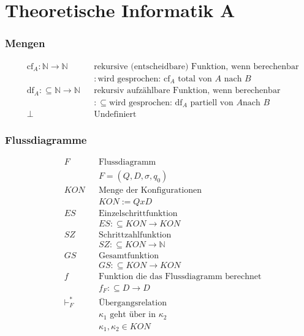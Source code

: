 \documentclass[10pt,oneside,a4paper]{scrartcl}
\begin{document}
\part{Theoretische Informatik A}

\section{Mengen}

    \begin{align}
    &\text{cf}_A :\mathbb{N} \longrightarrow \mathbb{N}
        && \text{rekursive (entscheidbare) Funktion, wenn berechenbar}\\
        &&&: \text{wird gesprochen: $\text{cf}_A$ total von $A$ nach $B$}
        \nonumber\\
    &\text{df}_A :\subseteq \mathbb{N} \longrightarrow \mathbb{N}
        && \text{rekursiv aufzählbare Funktion, wenn berechenbar}\\
        &&&:\subseteq \text{wird gesprochen: $\text{df}_A$ partiell von $A$
        nach $B$}\nonumber\\
    &\perp && \text{Undefiniert}
    \end{align}

\section{Flussdiagramme}

    \begin{align}
    &F   && \text{Flussdiagramm}\nonumber\\
            &&&F = (Q, D, \sigma, q_0)\\
    &KON && \text{Menge der Konfigurationen}\nonumber\\
            &&&KON := Q x D\\
    &ES  && \text{Einzelschrittfunktion}\nonumber\\
            &&&ES :\subseteq KON \longrightarrow KON\\
    &SZ  && \text{Schrittzahlfunktion}\nonumber\\
            &&&SZ :\subseteq KON \longrightarrow \mathbb{N}\\
    &GS  && \text{Gesamtfunktion}\nonumber\\
            &&&GS :\subseteq KON \longrightarrow KON\\
    &f   && \text{Funktion die das Flussdiagramm berechnet}\nonumber\\
            &&&f_F :\subseteq D \longrightarrow D\\
    &\vdash^{*}_{F}
         && \text{Übergangsrelation}\\
            &&&\kappa_{1} \text{ geht über in }\kappa_{2}\nonumber\\
            &&&\kappa_{1}, \kappa_{2} \in KON\nonumber
    \end{align}
\end{document}

